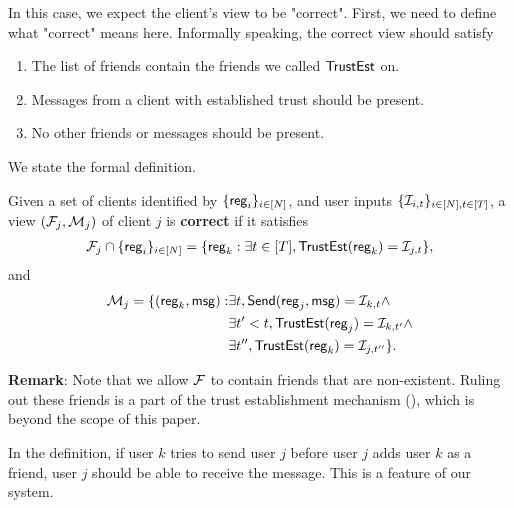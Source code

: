 In this case, we expect the client's view to be "correct". First, we need to define what "correct" means here. Informally speaking, the correct view should satisfy
\begin{enumerate}
    \item The list of friends contain the friends we called $\mathsf{TrustEst}$ on.         
    \item Messages from a client with established trust should be present.  
    \item No other friends or messages should be present. 
\end{enumerate}
We state the formal definition.
\begin{definition}
\label{defn:client-view-correct}
Given a set of clients identified by $\{\mathsf{reg}_i\}_{i \in [N]}$, and user inputs $\{\mathcal{I}_{i, t}\}_{i \in [N], t \in [T]}$, a view $(\mathcal{F}_j, \mathcal{M}_j)$ of client $j$ is \textbf{correct} if it satisfies
\begin{multline*}
\mathcal{F}_j \cap \{\mathsf{reg}_i\}_{i \in [N]} = \{\mathsf{reg}_k: \exists t \in [T], \mathsf{TrustEst}(\mathsf{reg}_k) = \mathcal{I}_{j, t}\},    
\end{multline*}
and
\begin{align*}
 \mathcal{M}_j = \{(\mathsf{reg}_k, \mathsf{msg}): &\exists t, \mathsf{Send}(\mathsf{reg}_j, \mathsf{msg}) = \mathcal{I}_{k, t} \land \\
 &\exists t' < t, \mathsf{TrustEst}(\mathsf{reg}_j) = \mathcal{I}_{k, t'} \land \\
 &\exists t'', \mathsf{TrustEst}(\mathsf{reg}_k) = \mathcal{I}_{j, t''}\}.   
\end{align*}
\end{definition}
\textbf{Remark}: Note that we allow $\mathcal{F}$ to contain friends that are non-existent. Ruling out these friends is a part of the trust establishment mechanism (\cite[Section 4]{whitepaper}), which is beyond the scope of this paper. 

In the definition, if user $k$ tries to send user $j$ before user $j$ adds user $k$ as a friend, user $j$ should be able to receive the message. This is a feature of our system. 

